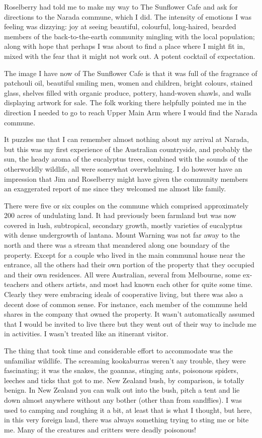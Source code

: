 Roselberry had told me to make my way to The Sunflower Cafe and ask for
directions to the Narada commune, which I did. The intensity of emotions
I was feeling was dizzying: joy at seeing beautiful, colourful,
long-haired, bearded members of the back-to-the-earth community mingling
with the local population; along with hope that perhaps I was about to
find a place where I might fit in, mixed with the fear that it might not
work out. A potent cocktail of expectation.

The image I have now of The Sunflower Cafe is that it was full of the
fragrance of patchouli oil, beautiful smiling men, women and children,
bright colours, stained glass, shelves filled with organic produce,
pottery, hand-woven shawls, and walls displaying artwork for sale. The
folk working there helpfully pointed me in the direction I needed to go
to reach Upper Main Arm where I would find the Narada commune.

It puzzles me that I can remember almost nothing about my arrival at
Narada, but this was my first experience of the Australian countryside,
and probably the sun, the heady aroma of the eucalyptus trees, combined
with the sounds of the otherworldly wildlife, all were somewhat
overwhelming. I do however have an impression that Jim and Roselberry
might have given the community members an exaggerated report of me since
they welcomed me almost like family.

There were five or six couples on the commune which comprised
approximately 200 acres of undulating land. It had previously been
farmland but was now covered in lush, subtropical, secondary growth,
mostly varieties of eucalyptus with dense undergrowth of lantana. Mount
Warning was not far away to the north and there was a stream that
meandered along one boundary of the property. Except for a couple who
lived in the main communal house near the entrance, all the others had
their own portion of the property that they occupied and their own
residences. All were Australian, several from Melbourne, some
ex-teachers and others artists, and most had known each other for quite
some time. Clearly they were embracing ideals of cooperative living, but
there was also a decent dose of common sense. For instance, each member
of the commune held shares in the company that owned the property. It
wasn't automatically assumed that I would be invited to live there but
they went out of their way to include me in activities. I wasn't treated
like an itinerant visitor.

The thing that took time and considerable effort to accommodate was the
unfamiliar wildlife. The screaming kookaburras weren't any trouble, they were
fascinating; it was the snakes, the goannas, stinging ants, poisonous
spiders, leeches and ticks that got to me. New Zealand bush, by
comparison, is totally benign. In New Zealand you can walk out into the
bush, pitch a tent and lie down almost anywhere without any bother
(other than from sandflies). I was used to camping and roughing it a
bit, at least that is what I thought, but here, in this very foreign
land, there was always something trying to sting me or bite me. Many of
the creatures and critters were deadly poisonous!

